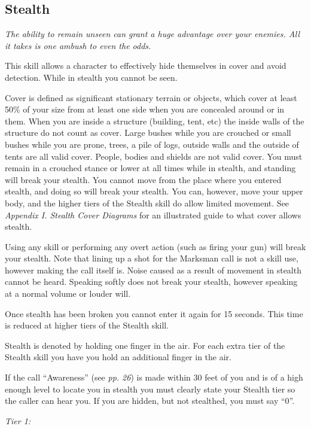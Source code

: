 \documentclass{scrbook}
\begin{document}
\subsection{Stealth}

\textit{The ability to remain unseen can grant a huge advantage over your enemies. All it takes is one ambush to even the odds.}

This skill allows a character to effectively hide themselves in cover and avoid detection. While in stealth you cannot be seen.

Cover is defined as significant stationary terrain or objects, which cover at least 50\% of your size from at least one side when you are concealed around or in them. When you are inside a structure (building, tent, etc) the inside walls of the structure do not count as cover. Large bushes while you are crouched or small bushes while you are prone, trees, a pile of logs, outside walls and the outside of tents are all valid cover. People, bodies and shields are not valid cover. You must remain in a crouched stance or lower at all times while in stealth, and standing will break your stealth. You cannot move from the place where you entered stealth, and doing so will break your stealth. You can, however, move your upper body, and the higher tiers of the Stealth skill do allow limited movement. See \textit{Appendix I. Stealth Cover Diagrams} for an illustrated guide to what cover allows stealth.

Using any skill or performing any overt action (such as firing your gun) will break your stealth. Note that lining up a shot for the Marksman call is not a skill use, however making the call itself is. Noise caused as a result of movement in stealth cannot be heard. Speaking softly does not break your stealth, however speaking at a normal volume or louder will.

Once stealth has been broken you cannot enter it again for 15 seconds. This time is reduced at higher tiers of the Stealth skill.

Stealth is denoted by holding one finger in the air. For each extra tier of the Stealth skill you have you hold an additional finger in the air.

If the call ``Awareness'' (see \textit{pp. 26}) is made within 30 feet of you and is of a high enough level to locate you in stealth you must clearly state your Stealth tier so the caller can hear you. If you are hidden, but not stealthed, you must say ``0''.

\textit{Tier 1:}
\end{document}
